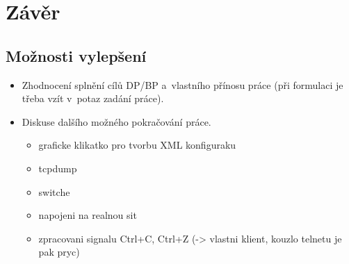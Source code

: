 \documentclass[11pt,twoside,a4paper]{book}
\begin{document}



















\chapter{Závěr}
\section{Možnosti vylepšení}

\begin{itemize}
\item Zhodnocení splnění cílů DP/BP a~vlastního přínosu práce (při formulaci je třeba vzít v~potaz zadání práce).
\item Diskuse dalšího možného pokračování práce.
\begin{itemize}
\item graficke klikatko pro tvorbu XML konfiguraku
\item tcpdump
\item switche
\item napojeni na realnou sit
\item zpracovani signalu Ctrl+C, Ctrl+Z (-> vlastni klient, kouzlo telnetu je pak pryc)
\end{itemize} 


\end{itemize} 

\end{document}
